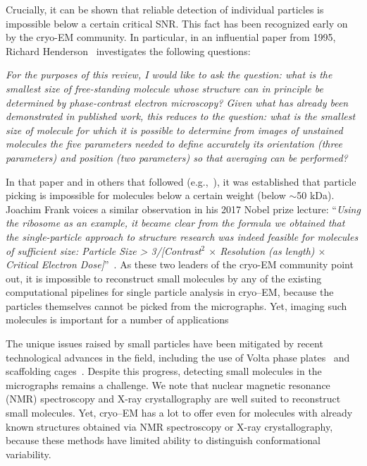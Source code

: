 \documentclass[9pt,twocolumn,twoside,lineno]{pnas-new}
\begin{document}
Crucially, it can be shown that reliable detection of individual particles is impossible below a certain critical SNR. This fact has been recognized early on by the cryo-EM community. In particular, in an influential paper from 1995, Richard Henderson~\cite{henderson1995limitations} investigates the following questions:
\begin{myquote}{0.15in}
	\emph{For the purposes of this review, I would like to ask the question: what is the smallest size of free-standing molecule whose structure can in principle be determined by phase-contrast electron microscopy? Given what has already been demonstrated in published work, this reduces to the question: what is the smallest size of molecule for which it is possible to determine from images of unstained molecules the five parameters needed to define accurately its orientation (three parameters) and position (two parameters) so that averaging can be performed?}
\end{myquote}
In that paper and in others that followed (e.g.,~\cite{glaeser1999electron}), it was established that particle picking is impossible for molecules below a certain weight (below $\sim$50 kDa). 
Joachim Frank voices a similar observation in his 2017 Nobel prize lecture: ``\emph{Using the ribosome as an example, it became clear from the formula we obtained that the single-particle approach to structure research was indeed feasible for molecules of sufficient size: Particle Size > 3/[Contrast$^2$ $\times$ Resolution (as length) $\times$ Critical Electron Dose]}''~\cite{frank2018single}. 
As these two leaders of the cryo-EM community point out, it is impossible to reconstruct small molecules by any of the existing computational pipelines for single particle analysis in cryo--EM, because the particles themselves cannot be picked from the micrographs. Yet, imaging such molecules is important for a number of applications~\cite{scapin2018cryo}

The unique issues raised by small particles have been mitigated by recent technological advances in the field, including the use of Volta phase plates~\cite{khoshouei2017cryo,liang2017phase} and scaffolding cages~\cite{liu2018nearatomic}.
Despite this progress, detecting small molecules in the micrographs remains a challenge.
We note that nuclear magnetic resonance (NMR) spectroscopy and X-ray crystallography are well suited to reconstruct small molecules. Yet, cryo--EM has a lot to offer even for molecules with already known structures obtained via NMR spectroscopy or X-ray crystallography, because these methods have limited ability to distinguish conformational variability.  
\end{document}
